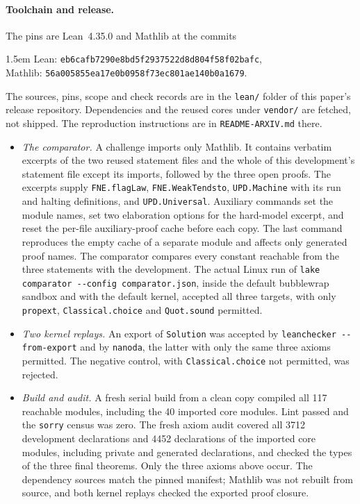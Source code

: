 \paragraph{Toolchain and release.} The pins are Lean~4.35.0 and Mathlib at the commits
\begin{flushleft}\small\leftskip1.5em
Lean: \nolinkurl{eb6cafb7290e8bd5f2937522d8d804f58f02bafc},\\
Mathlib: \nolinkurl{56a005855ea17e0b0958f73ec801ae140b0a1679}.
\end{flushleft}
The sources, pins, scope and check records are in the \texttt{lean/} folder of this paper's release repository. Dependencies and the reused cores under \texttt{vendor/} are fetched, not shipped. The reproduction instructions are in \texttt{README-ARXIV.md} there.
\begin{itemize}
\item \emph{The comparator.} A challenge imports only Mathlib. It contains verbatim excerpts of the two reused statement files and the whole of this development's statement file except its imports, followed by the three open proofs. The excerpts supply \texttt{FNE.flagLaw}, \texttt{FNE.WeakTendsto}, \texttt{UPD.Machine} with its run and halting definitions, and \texttt{UPD.Universal}. Auxiliary commands set the module names, set two elaboration options for the hard-model excerpt, and reset the per-file auxiliary-proof cache before each copy. The last command reproduces the empty cache of a separate module and affects only generated proof names. The comparator compares every constant reachable from the three statements with the development. The actual Linux run of \texttt{lake comparator -{}-config comparator.json}, inside the default bubblewrap sandbox and with the default kernel, accepted all three targets, with only \texttt{propext}, \texttt{Classical.choice} and \texttt{Quot.sound} permitted.
\item \emph{Two kernel replays.} An export of \texttt{Solution} was accepted by \texttt{leanchecker -{}-from-export} and by \texttt{nanoda}, the latter with only the same three axioms permitted. The negative control, with \texttt{Classical.choice} not permitted, was rejected.
\item \emph{Build and audit.} A fresh serial build from a clean copy compiled all 117 reachable modules, including the 40 imported core modules. Lint passed and the \texttt{sorry} census was zero. The fresh axiom audit covered all 3712 development declarations and 4452 declarations of the imported core modules, including private and generated declarations, and checked the types of the three final theorems. Only the three axioms above occur. The dependency sources match the pinned manifest; Mathlib was not rebuilt from source, and both kernel replays checked the exported proof closure.
\end{itemize}


